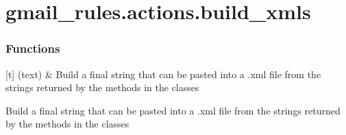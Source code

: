 \documentclass[letterpaper,10pt,english]{sphinxmanual}
\begin{document}
\sphinxstepscope


\section{gmail\_rules.actions.build\_xmls}
\label{\detokenize{_autosummary/gmail_rules.actions.build_xmls:module-gmail_rules.actions.build_xmls}}\label{\detokenize{_autosummary/gmail_rules.actions.build_xmls:gmail-rules-actions-build-xmls}}\label{\detokenize{_autosummary/gmail_rules.actions.build_xmls::doc}}\subsubsection*{Functions}


\begin{savenotes}\sphinxattablestart
\sphinxthistablewithglobalstyle
\sphinxthistablewithnovlinesstyle
\centering
\begin{tabulary}{\linewidth}[t]{}
\sphinxtoprule
\sphinxtableatstartofbodyhook
\sphinxAtStartPar
{\hyperref[\detokenize{_autosummary/gmail_rules.actions.build_xmls:gmail_rules.actions.build_xmls.build_xml_text}]{}}(text)
&
\sphinxAtStartPar
Build a final string that can be pasted into a .xml file from the strings returned by the  methods in the  classes
\\
\sphinxbottomrule
\end{tabulary}
\sphinxtableafterendhook\par
\sphinxattableend\end{savenotes}

\begin{fulllineitems}
\label{\detokenize{_autosummary/gmail_rules.actions.build_xmls:gmail_rules.actions.build_xmls.build_xml_text}}
\pysigstartsignatures
{}
\pysigstopsignatures
\sphinxAtStartPar
Build a final string that can be pasted into a .xml file from the strings
returned by the  methods in the  classes

\end{fulllineitems}
\end{document}
